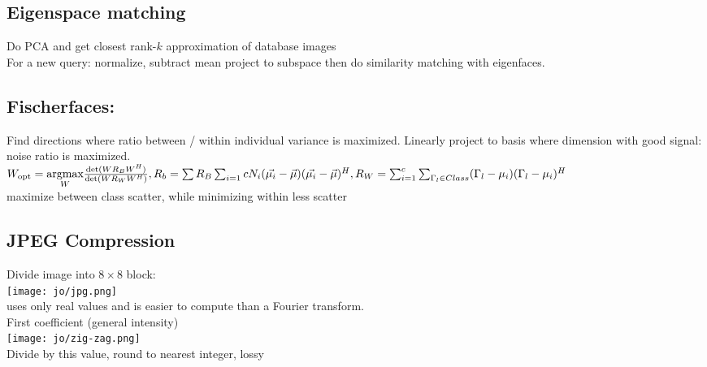 \subsection*{Eigenspace matching}
Do PCA  and get closest rank-$k$ approximation of database images  \\
For a new query: normalize, subtract mean  project to subspace then do similarity matching with eigenfaces.
\subsection{Fischerfaces:} 
Find directions where ratio between / within individual variance is maximized. Linearly project to basis where dimension with good signal: noise ratio is maximized. \\
$W_{\text{opt}} = \underset{W}{\text{argmax}} \frac{\det(W R_B W^H)}{\det(W R_W W^H)}, R_b = \sum R_B \sum_{i = 1}{c} N_i (\vec{\mu_i} - \vec{\mu})(\vec{\mu_i} - \vec{\mu})^H, R_W = \sum_{i = 1}^{c} \sum_{\Gamma_l \in Class} (\Gamma_l - \mu_i)(\Gamma_l - \mu_i)^H$\\
 maximize between class scatter, while minimizing within less scatter
\subsection*{JPEG Compression}
Divide image into $8 \times 8$ block:\\
\texttt{[image: jo/jpg.png]}\\
 uses only real values and is easier to compute than a Fourier transform.\\
 First coefficient (general intensity)\\
 \texttt{[image: jo/zig-zag.png]}\\
 Divide by this value, round to nearest integer, lossy